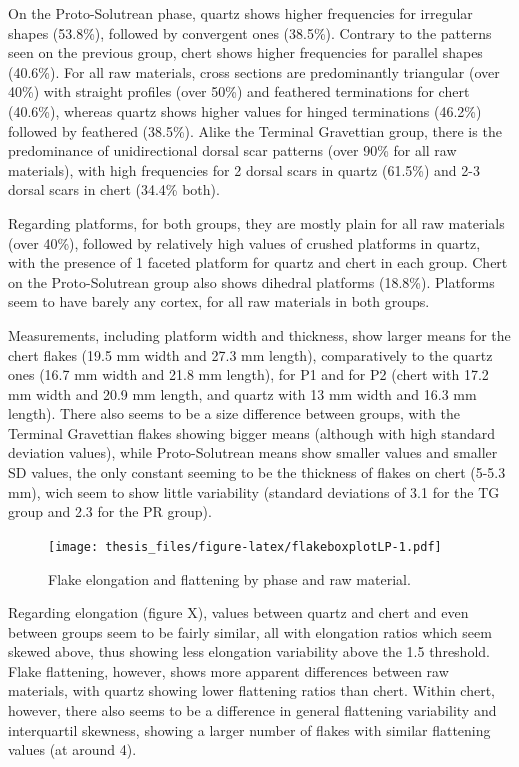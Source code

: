 \documentclass[12pt,twoside]{reedthesis}
\begin{document}
On the Proto-Solutrean phase, quartz shows higher frequencies for irregular shapes (53.8\%), followed by convergent ones (38.5\%). Contrary to the patterns seen on the previous group, chert shows higher frequencies for parallel shapes (40.6\%). For all raw materials, cross sections are predominantly triangular (over 40\%) with straight profiles (over 50\%) and feathered terminations for chert (40.6\%), whereas quartz shows higher values for hinged terminations (46.2\%) followed by feathered (38.5\%). Alike the Terminal Gravettian group, there is the predominance of unidirectional dorsal scar patterns (over 90\% for all raw materials), with high frequencies for 2 dorsal scars in quartz (61.5\%) and 2-3 dorsal scars in chert (34.4\% both).

Regarding platforms, for both groups, they are mostly plain for all raw materials (over 40\%), followed by relatively high values of crushed platforms in quartz, with the presence of 1 faceted platform for quartz and chert in each group. Chert on the Proto-Solutrean group also shows dihedral platforms (18.8\%). Platforms seem to have barely any cortex, for all raw materials in both groups.

Measurements, including platform width and thickness, show larger means for the chert flakes (19.5 mm width and 27.3 mm length), comparatively to the quartz ones (16.7 mm width and 21.8 mm length), for P1 and for P2 (chert with 17.2 mm width and 20.9 mm length, and quartz with 13 mm width and 16.3 mm length). There also seems to be a size difference between groups, with the Terminal Gravettian flakes showing bigger means (although with high standard deviation values), while Proto-Solutrean means show smaller values and smaller SD values, the only constant seeming to be the thickness of flakes on chert (5-5.3 mm), wich seem to show little variability (standard deviations of 3.1 for the TG group and 2.3 for the PR group).
\begin{figure}
\centering
\texttt{[image: thesis\_files/figure-latex/flakeboxplotLP-1.pdf]}
\caption{\label{fig:flakeboxplotLP}Flake elongation and flattening by phase and raw material.}
\end{figure}
Regarding elongation (figure X), values between quartz and chert and even between groups seem to be fairly similar, all with elongation ratios which seem skewed above, thus showing less elongation variability above the 1.5 threshold. Flake flattening, however, shows more apparent differences between raw materials, with quartz showing lower flattening ratios than chert. Within chert, however, there also seems to be a difference in general flattening variability and interquartil skewness, showing a larger number of flakes with similar flattening values (at around 4).
\end{document}
